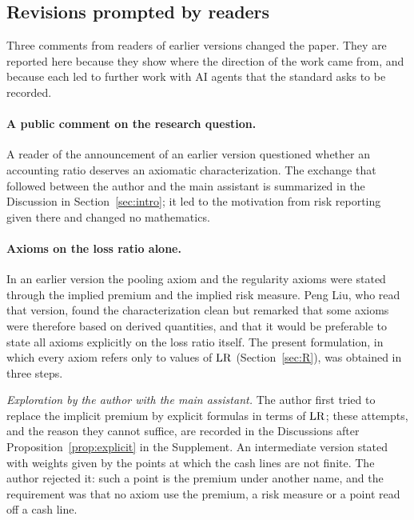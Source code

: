 

\subsection{Revisions prompted by readers}\label{sec:collab-revision}

Three comments from readers of earlier versions changed the paper. They are reported here because they show where
the direction of the work came from, and because each led to further work with AI agents that the standard asks to
be recorded.

\paragraph{A public comment on the research question.}
A reader of the announcement of an earlier version questioned whether an accounting ratio deserves an axiomatic
characterization. The exchange that followed between the author and the main assistant is summarized in the
Discussion in Section~\ref{sec:intro}; it led to the motivation from risk reporting given there and changed no
mathematics.

\paragraph{Axioms on the loss ratio alone.}
In an earlier version the pooling axiom \axCM{} and the regularity axioms were stated through the implied premium
and the implied risk measure. Peng Liu, who read that version, found the characterization clean but remarked that
some axioms were therefore based on derived quantities, and that it would be preferable to state all axioms
explicitly on the loss ratio itself. The present formulation, in which every axiom refers only to values of $\mathrm{LR}$
(Section~\ref{sec:R}), was obtained in three steps.

\emph{Exploration by the author with the main assistant.} The author first tried to replace the implicit premium by
explicit formulas in terms of $\mathrm{LR}$; these attempts, and the reason they cannot suffice, are recorded in the
Discussions after Proposition~\ref{prop:explicit} in the Supplement. An intermediate version stated \axCM{} with weights given by the
points at which the cash lines are not finite. The author rejected it: such a point is the premium under another
name, and the requirement was that no axiom use the premium, a risk measure or a point read off a cash line.

